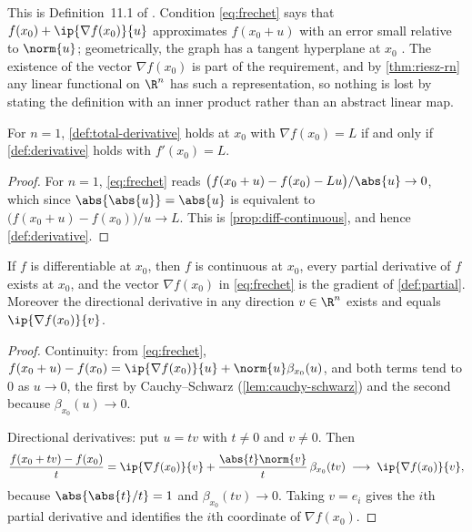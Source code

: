 This is Definition~11.1 of \textcite[p.~369]{fukuda2026notes}. Condition
\eqref{eq:frechet} says that $f(x_0)+\ip{\nabla f(x_0)}{u}$ approximates
$f(x_0+u)$ with an error small relative to $\norm{u}$; geometrically, the graph
has a tangent hyperplane at $x_0$ \autocite[slide 50]{fukuda2026calculus}. The
existence of the vector $\nabla f(x_0)$ is part of the requirement, and by
\autoref{thm:riesz-rn} any linear functional on $\R^n$ has such a
representation, so nothing is lost by stating the definition with an inner
product rather than an abstract linear map.

\begin{proposition}\label{prop:consistency-1d}
	For $n=1$, \autoref{def:total-derivative} holds at $x_0$ with
	$\nabla f(x_0)=L$ if and only if \autoref{def:derivative} holds with
	$f'(x_0)=L$.
\end{proposition}

\begin{proof}
	For $n=1$, \eqref{eq:frechet} reads
	$\bigl(f(x_0+u)-f(x_0)-Lu\bigr)/\abs{u}\to0$, which since
	$\abs{\abs{u}}=\abs{u}$ is equivalent to
	$\bigl(f(x_0+u)-f(x_0)\bigr)/u\to L$. This is
	\autoref{prop:diff-continuous}, and hence \autoref{def:derivative}.
\end{proof}

\begin{proposition}
	\label{prop:differentiable-implies}
	If $f$ is differentiable at $x_0$, then $f$ is continuous at $x_0$, every
	partial derivative of $f$ exists at $x_0$, and the vector $\nabla f(x_0)$ in
	\eqref{eq:frechet} is the gradient of \autoref{def:partial}. Moreover the
	directional derivative in any direction $v\in\R^n$ exists and equals
	$\ip{\nabla f(x_0)}{v}$.
\end{proposition}

\begin{proof}
	Continuity: from \eqref{eq:frechet},
	$f(x_0+u)-f(x_0)=\ip{\nabla f(x_0)}{u}+\norm{u}\beta_{x_0}(u)$, and both terms
	tend to $0$ as $u\to0$, the first by Cauchy--Schwarz
	(\autoref{lem:cauchy-schwarz}) and the second because
	$\beta_{x_0}(u)\to0$.

	Directional derivatives: put $u=tv$ with $t\neq0$ and $v\neq0$. Then
	\[
		\frac{f(x_0+tv)-f(x_0)}{t}
		=\ip{\nabla f(x_0)}{v}+\frac{\abs{t}\norm{v}}{t}\,\beta_{x_0}(tv)
		\;\longrightarrow\;\ip{\nabla f(x_0)}{v},
	\]
	because $\abs{\abs{t}/t}=1$ and $\beta_{x_0}(tv)\to0$. Taking $v=e_i$ gives the
	$i$th partial derivative and identifies the $i$th coordinate of
	$\nabla f(x_0)$.
\end{proof}

